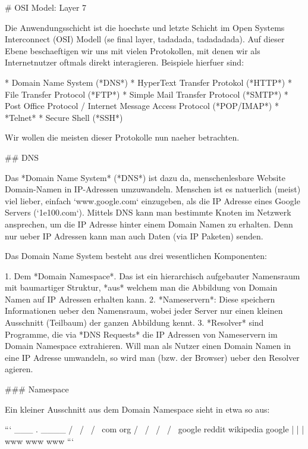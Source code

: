 # OSI Model: Layer 7

Die Anwendungsschicht ist die hoechste und letzte Schicht im Open Systems
Interconnect (OSI) Modell (se final layer, tadadada, tadadadada). Auf dieser
Ebene beschaeftigen wir uns mit vielen Protokollen, mit denen wir als
Internetnutzer oftmals direkt interagieren. Beispiele hierfuer sind:

* Domain Name System (*DNS*)
* HyperText Transfer Protokol (*HTTP*)
* File Transfer Protocol (*FTP*)
* Simple Mail Transfer Protocol (*SMTP*)
* Post Office Protocol / Internet Message Access Protocol (*POP/IMAP*)
* *Telnet*
* Secure Shell (*SSH*)

Wir wollen die meisten dieser Protokolle nun naeher betrachten.

## DNS

Das *Domain Name System* (*DNS*) ist dazu da, menschenlesbare Website
Domain-Namen in IP-Adressen umzuwandeln. Menschen ist es natuerlich (meist) viel
lieber, einfach `www.google.com` einzugeben, als die IP Adresse eines Google
Servers (`1e100.com`). Mittels DNS kann man bestimmte Knoten im Netzwerk
ansprechen, um die IP Adresse hinter einem Domain Namen zu erhalten. Denn nur
ueber IP Adressen kann man auch Daten (via IP Paketen) senden.

Das Domain Name System besteht aus drei wesentlichen Komponenten:

1. Dem *Domain Namespace*. Das ist ein hierarchisch aufgebauter Namensraum mit
   baumartiger Struktur, *aus* welchem man die Abbildung von Domain Namen auf IP
   Adressen erhalten kann.
2. *Nameservern*: Diese speichern Informationen ueber den Namensraum, wobei
   jeder Server nur einen kleinen Ausschnitt (Teilbaum) der ganzen Abbildung
   kennt.
3. *Resolver* sind Programme, die via *DNS Requests* die IP Adressen von
   Nameservern im Domain Namespace extrahieren. Will man als Nutzer einen Domain
   Namen in eine IP Adresse umwandeln, so wird man (bzw. der Browser) ueber den
   Resolver agieren.

### Namespace

Ein kleiner Ausschnitt aus dem Domain Namespace sieht in etwa so aus:

```
          ___ . ____
         /          \
        /            \
       /              \
     com              org
    /   \            /   \
   /     \          /     \
google reddit  wikipedia google
  |                |       |
 www              www     www
```


